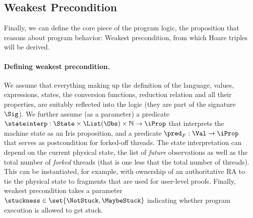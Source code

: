 \subsection{Weakest Precondition}

Finally, we can define the core piece of the program logic, the proposition that reasons about program behavior: Weakest precondition, from which Hoare triples will be derived.

\paragraph{Defining weakest precondition.}
We assume that everything making up the definition of the language, \ie values, expressions, states, the conversion functions, reduction relation and all their properties, are suitably reflected into the logic (\ie they are part of the signature $\Sig$).
We further assume (as a parameter) a predicate $\stateinterp : \State \times \List(\Obs) \times \mathbb N \to \iProp$ that interprets the machine state as an Iris proposition, and a predicate $\pred_F: \Val \to \iProp$ that serves as postcondition for forked-off threads.
The state interpretation can depend on the current physical state, the list of \emph{future} observations as well as the total number of \emph{forked} threads (that is one less that the total number of threads).
This can be instantiated, for example, with ownership of an authoritative RA to tie the physical state to fragments that are used for user-level proofs.
Finally, weakest precondition takes a parameter $\stuckness \in \set{\NotStuck, \MaybeStuck}$ indicating whether program execution is allowed to get stuck.

